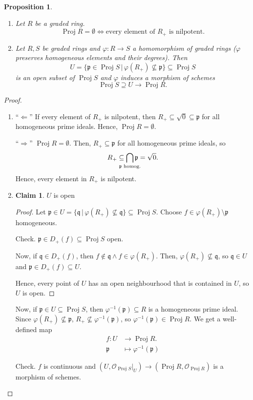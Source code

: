 \documentclass[12pt]{article}
\DeclareMathOperator{\Proj}{Proj}
\newtheorem*{proposition}{Proposition}
\theoremstyle{definition}
\newtheorem*{claim}{Claim}
\begin{document}
\begin{proposition}
\begin{enumerate}[label=\arabic*)]
\item Let $R$ be a graded ring.
\[\Proj R=\emptyset\Longleftrightarrow\text{every element of }R_+\text{ is nilpotent}.\]

\item Let $R,S$ be graded rings and $\varphi:R\rightarrow S$ a homomorphism of graded rings ($\varphi$ preserves homogeneous elements and their degrees). Then
\[U=\big\{\mathfrak p\in\Proj S\,\big|\,\varphi(R_+)\not\subseteq\mathfrak p\big\}\subseteq\Proj S\]
is an open subset of $\Proj S$ and $\varphi$ induces a morphism of schemes
\[\Proj S\supseteq U\longrightarrow\Proj R.\]
\end{enumerate}
\end{proposition}

\begin{proof}
\begin{enumerate}[label=\arabic*)]
\item ``$\Leftarrow$'' If every element of $R_+$ is nilpotent, then $R_+\subseteq\sqrt0\subseteq\mathfrak p$ for all homogeneous prime ideals. Hence, $\Proj R=\emptyset$.

``$\Rightarrow$'' $\Proj R=\emptyset$. Then, $R_+\subseteq\mathfrak p$ for all homogeneous prime ideals, so
\[R_+\subseteq\bigcap_{\mathclap{\mathfrak p\text{ homog.}}}\mathfrak p=\sqrt0.\]
Hence, every element in $R_+$ is nilpotent.

\item
\begin{claim}
$U$ is open
\end{claim}

\begin{proof}
Let $\mathfrak p\in U=\{\mathfrak q\,|\,\varphi(R_+)\not\subseteq\mathfrak q\}\subseteq\Proj S$. Choose $f\in\varphi(R_+)\setminus\mathfrak p$ homogeneous.

Check. $\mathfrak p\in D_+(f)\subseteq\Proj S$ open.

Now, if $\mathfrak q\in D_+(f)$, then $f\notin\mathfrak q\wedge f\in\varphi(R_+)$. Then, $\varphi(R_+)\not\subseteq\mathfrak q$, so $\mathfrak q\in U$ and $\mathfrak p\in D_+(f)\subseteq U$.

Hence, every point of $U$ has an open neighbourhood that is contained in $U$, so $U$ is open.
\end{proof}

Now, if $\mathfrak p\in U\subseteq\Proj S$, then $\varphi^{-1}(\mathfrak p)\subseteq R$ is a homogeneous prime ideal. Since $\varphi(R_+)\not\subseteq\mathfrak p$, $R_+\not\subseteq\varphi^{-1}(\mathfrak p)$, so $\varphi^{-1}(\mathfrak p)\in\Proj R$. We get a well-defined map
\begin{align*}
f:U&\longrightarrow\Proj R.\\\mathfrak p&\longmapsto\varphi^{-1}(\mathfrak p)
\end{align*}

Check. $f$ is continuous and $(U,\mathcal O_{\Proj S}|_U)\rightarrow(\Proj R,\mathcal O_{\Proj R})$ is a morphism of schemes.
\end{enumerate}
\end{proof}
\end{document}

